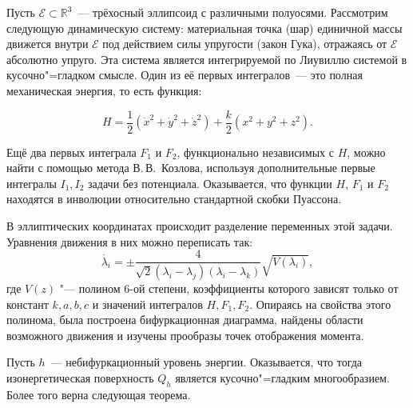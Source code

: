 



\vzmscaption



	Пусть $\mathcal{E}\subset \mathbb{R}^3$~--- трёхосный эллипсоид с различными полуосями. Рассмотрим следующую динамическую систему: материальная точка (шар) единичной массы движется внутри $\mathcal{E}$ под действием силы упругости (закон Гука), отражаясь от $\mathcal{E}$ абсолютно упруго.  Эта система является интегрируемой по Лиувиллю системой в кусочно"=гладком смысле. Один из её первых интегралов~--- это  полная механическая энер\-гия, то есть функция:

	\[
	H=\dfrac{1}{2}(\dot{x}^2+\dot{y}^2+\dot{z}^2)+\dfrac{k}{2}(x^2+y^2+z^2).
	\]

	Ещё два первых интеграла $F_1$ и $F_2$, функционально независимых с $H$, можно найти с помощью метода В.\,В.~Козлова, используя дополнительные первые ин\-те\-гра\-лы $I_1, I_2$ задачи без потенциала. Оказывается, что функции $H$, $F_1$ и $F_2$ находятся в инволюции относительно стандартной скобки Пуассона.

	В эллиптических координатах происходит разделение переменных этой задачи. Уравнения движения в них можно переписать так:
	\[
	\dot{\lambda_i}=\pm\dfrac{4}{\sqrt{2}(\lambda_i-\lambda_j)(\lambda_i-\lambda_k)}\sqrt{V(\lambda_i)},
	\]
	где $V(z)$ "--- полином 6-ой степени, коэффициенты которого зависят только от констант $k,a,b,c$ и значений интегралов $H,F_1,F_2$. Опираясь на свойства этого полинома, была построена бифуркационная диаграмма, найдены области возможного движения и изучены прообразы точек отображения момента.

	Пусть $h$~--- небифуркационный уровень энергии. Оказывается, что тогда изонергетическая поверхность $Q_h$ является кусочно"=гладким многообразием. Более того верна следующая теорема.

